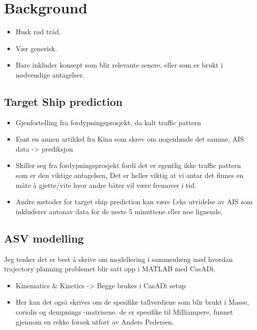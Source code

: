 \section{Background}
\begin{itemize}
    \item Husk rød tråd.
    \item Vær generisk.
    \item Bare inkluder konsept som blir relevante senere, eller som er brukt i nødvendige antagelser.
\end{itemize}

\subsection{Target Ship prediction}
\begin{itemize}
    \item Gjenfortelling fra fordypningsprosjekt, da kalt traffic pattern
    \item Fant en annen artikkel fra Kina som skrev om nogenlunde det samme, AIS data -> prediksjon
    \item Skiller seg fra fordypningsprosjekt fordi det er egentlig ikke traffic pattern som er den viktige antagelsen,
    Det er heller viktig at vi antar det finnes en måte å gjette/vite hvor andre båter vil være fremover i tid.
    \item Andre metoder for target ship prediction kan være f.eks utvidelse av AIS som inkluderer autonav data for de neste 5 minuttene eller noe lignende.
\end{itemize}

\subsection{ASV modelling}
Jeg tenker det er best å skrive om modellering i sammenheng med hvordan trajectory planning problemet blir satt opp i MATLAB med CasADi.
\begin{itemize}
    \item Kinematics \& Kinetics -> Begge brukes i CasADi setup
    \item Her kan det også skrives om de spesifike tallverdiene som blir brukt i Masse, coriolis og dempnings -matrisene.
    de er spesifike til Milliampere, funnet gjennom en rekke forsøk utfort av Anders Pedersen.
\end{itemize}

